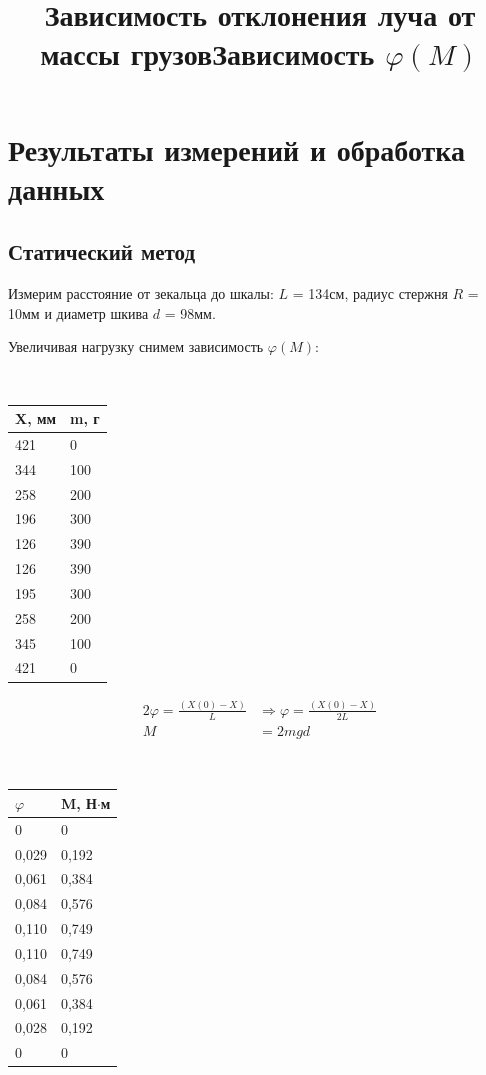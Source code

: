 \documentclass[a4paper, 12pt]{article}
\begin{document}
\section {Результаты измерений и обработка данных}

\subsection{Статический метод}

Измерим расстояние от зекальца до шкалы: $L$ = 134см, радиус стержня $R$ = 10мм и диаметр шкива $d$ = 98мм.

Увеличивая нагрузку снимем зависимость $\varphi(M)$:

\begin{center}
\title{Зависимость отклонения луча от массы грузов} \\
\begin{tabular}{|l|l|}
\hline
X, мм & m, г \\ \hline
421   & 0    \\ \hline
344   & 100  \\ \hline
258   & 200  \\ \hline
196   & 300  \\ \hline
126   & 390  \\ \hline
126   & 390  \\ \hline
195   & 300  \\ \hline
258   & 200  \\ \hline
345   & 100  \\ \hline
421   & 0    \\ \hline
\end{tabular}
\end{center}

\begin{align*}
2\varphi = \frac{(X(0) - X)}{L} &\Rightarrow \varphi = \frac{(X(0) - X)}{2L} \\
M &= 2mgd
\end{align*}

\begin{center}
\title{Зависимость $\varphi(M)$} \\
\begin{tabular}{|l|l|}
\hline
$\varphi$ & M, Н$\cdot$м \\ \hline
0     & 0      \\ \hline
0,029 & 0,192  \\ \hline
0,061 & 0,384  \\ \hline
0,084 & 0,576  \\ \hline
0,110 & 0,749  \\ \hline
0,110 & 0,749  \\ \hline
0,084 & 0,576  \\ \hline
0,061 & 0,384  \\ \hline
0,028 & 0,192  \\ \hline
0     & 0      \\ \hline
\end{tabular}
\end{center}
\end{document}
